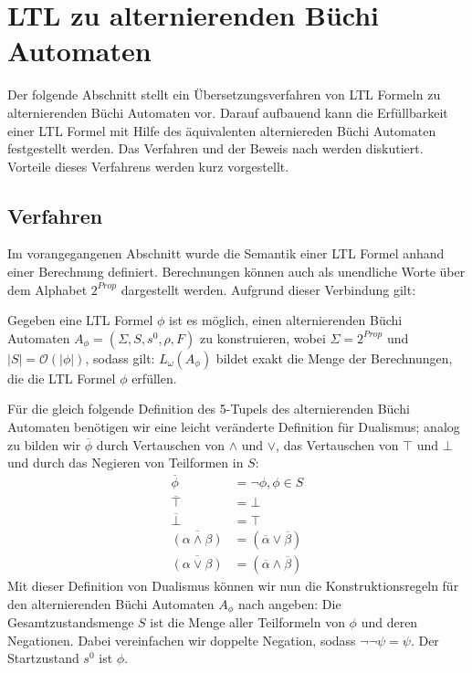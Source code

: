 \section{LTL zu alternierenden Büchi Automaten}

Der folgende Abschnitt stellt ein Übersetzungsverfahren von LTL Formeln zu alternierenden Büchi Automaten vor. Darauf aufbauend kann die Erfüllbarkeit einer LTL Formel mit Hilfe des äquivalenten alterniereden Büchi Automaten festgestellt werden. Das Verfahren und der Beweis nach \cite{vardi+96} werden diskutiert. Vorteile dieses Verfahrens werden kurz vorgestellt. 


\subsection{Verfahren}
\label{subsection:verfahren}
Im vorangegangenen Abschnitt wurde die Semantik einer LTL Formel anhand einer Berechnung definiert. Berechnungen können auch als unendliche Worte über dem Alphabet $2^{Prop}$ dargestellt werden\cite{vardi+96}. Aufgrund dieser Verbindung gilt:
\begin{satz}\cite{vardi+96}
    Gegeben eine LTL Formel $\phi$ ist es möglich, einen alternierenden Büchi Automaten $A_\phi = (\Sigma, S, s^0, \rho, F)$ zu konstruieren, wobei $\Sigma = 2^{Prop}$ und $|S| = \mathcal{O}(|\phi|)$, sodass gilt: $L_\omega(A_\phi)$ bildet exakt die Menge der Berechnungen, die die LTL Formel $\phi$ erfüllen.
\end{satz}
Für die gleich folgende Definition des 5-Tupels des alternierenden Büchi Automaten benötigen wir eine leicht veränderte Definition für Dualismus; analog zu \cite{vardi+96} bilden wir $\overline{\phi}$ durch Vertauschen von $\land$ und $\lor$, das Vertauschen von $\top$ und $\bot$ und durch das Negieren von Teilformen in $S$:
\begin{equation}
\label{aba-zu-ltl:dualismus}
\begin{split}
    \overline{\phi} &= \lnot\phi, \phi \in S\\
    \overline{\top} &= \bot\\
    \overline{\bot} &= \top\\
    \overline{(\alpha \land \beta)} &= (\overline{\alpha} \lor \overline{\beta})\\
    \overline{(\alpha \lor \beta)} &= (\overline{\alpha} \land \overline{\beta})
\end{split}
\end{equation}
Mit dieser Definition von Dualismus können wir nun die Konstruktionsregeln für den alternierenden Büchi Automaten $A_\phi$ nach \cite{vardi+96} angeben: Die Gesamtzustandsmenge $S$ ist die Menge aller Teilformeln von $\phi$ und deren Negationen. Dabei vereinfachen wir doppelte Negation, sodass $\lnot\lnot\psi = \psi$. Der Startzustand $s^0$ ist $\phi$. 
